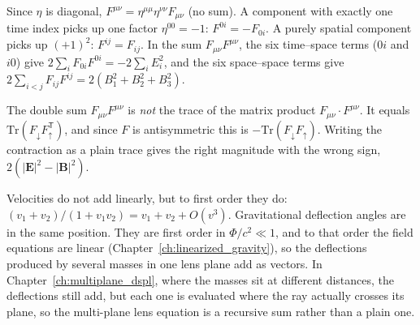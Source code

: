 \begin{derivation}
Since $\eta$ is diagonal, $F^{\mu\nu} = \eta^{\mu\mu}\eta^{\nu\nu}F_{\mu\nu}$ (no sum). A component
with exactly one time index picks up one factor $\eta^{00} = -1$: $F^{0i} = -F_{0i}$. A purely
spatial component picks up $(+1)^2$: $F^{ij} = F_{ij}$. In the sum
$F_{\mu\nu}F^{\mu\nu}$, the six time--space terms ($0i$ and $i0$) give
$2\sum_i F_{0i}F^{0i} = -2\sum_i E_i^2$, and the six space--space terms give
$2\sum_{i<j}F_{ij}F^{ij} = 2(B_1^2 + B_2^2 + B_3^2)$.
\end{derivation}

\begin{annotation}
The double sum $F_{\mu\nu}F^{\mu\nu}$ is \emph{not} the trace of the matrix product
$F_{\mu\nu}\cdot F^{\mu\nu}$. It equals $\mathrm{Tr}(F_\downarrow F_\uparrow^{\mathsf T})$, and since
$F$ is antisymmetric this is $-\mathrm{Tr}(F_\downarrow F_\uparrow)$. Writing the contraction as a
plain trace gives the right magnitude with the wrong sign, $2(|\mathbf E|^2 - |\mathbf B|^2)$.
\end{annotation}

\begin{bridge}
Velocities do not add linearly, but to first order they do:
$(v_1 + v_2)/(1 + v_1v_2) = v_1 + v_2 + O(v^3)$. Gravitational deflection angles are in the same
position. They are first order in $\Phi/c^2 \ll 1$, and to that order the field equations are
linear (Chapter~\ref{ch:linearized_gravity}), so the deflections produced by several masses in
one lens plane add as vectors. In Chapter~\ref{ch:multiplane_dspl}, where the masses sit at
different distances, the deflections still add, but each one is evaluated where the ray
actually crosses its plane, so the multi-plane lens equation is a recursive sum rather than a
plain one.
\end{bridge}
